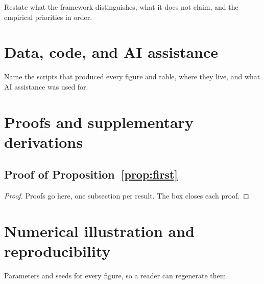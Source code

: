 \documentclass[11pt,a4paper]{article}
\theoremstyle{plain}
\theoremstyle{definition}
\theoremstyle{remark}
\begin{document}
Restate what the framework distinguishes, what it does not claim, and the
empirical priorities in order.

\section*{Data, code, and AI assistance}

Name the scripts that produced every figure and table, where they live, and what
AI assistance was used for.

\appendix
\section{Proofs and supplementary derivations}

\subsection{Proof of Proposition~\ref{prop:first}}

\begin{proof}
Proofs go here, one subsection per result. The box closes each proof.
\end{proof}

\section*{Numerical illustration and reproducibility}

Parameters and seeds for every figure, so a reader can regenerate them.


\end{document}
